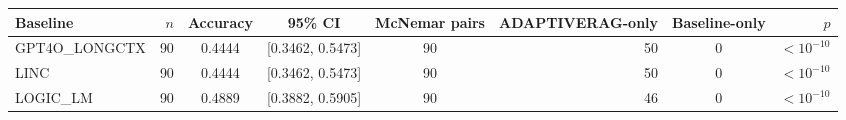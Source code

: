 \begin{tabular}{lrcccrcr}
\toprule
Baseline & $n$ & Accuracy & 95\% CI & McNemar pairs & ADAPTIVERAG-only & Baseline-only & $p$ \\
\midrule
GPT4O\_LONGCTX & 90 & 0.4444 & [0.3462, 0.5473] & 90 & 50 & 0 & $<10^{-10}$ \\
LINC & 90 & 0.4444 & [0.3462, 0.5473] & 90 & 50 & 0 & $<10^{-10}$ \\
LOGIC\_LM & 90 & 0.4889 & [0.3882, 0.5905] & 90 & 46 & 0 & $<10^{-10}$ \\
\bottomrule
\end{tabular}
